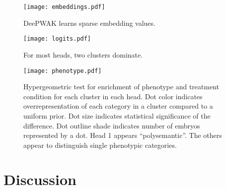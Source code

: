 \documentclass{article}
\begin{document}
\begin{figure}
  \texttt{[image: embeddings.pdf]}
    \caption{DeePWAK learns sparse embedding values. }
    \label{fig:}
\end{figure}

    
\begin{figure}
  \texttt{[image: logits.pdf]}
  \caption{For most heads, two clusters dominate.}
  \label{fig:}
\end{figure}

\begin{figure}
  \texttt{[image: phenotype.pdf]}
  \caption{Hypergeometric test for enrichment of phenotype and treatment condition for each cluster in each head. Dot color indicates overrepresentation of each category in a cluster compared to a uniform prior. Dot size indicates statistical significance of the difference. Dot outline shade indicates number of embryos represented by a dot. Head 1 appears ``polysemantic''. The others appear to distinguish single phenotypic categories.}
  \label{fig:}
\end{figure}

\section{Discussion}

\printbibliography
\end{document}
